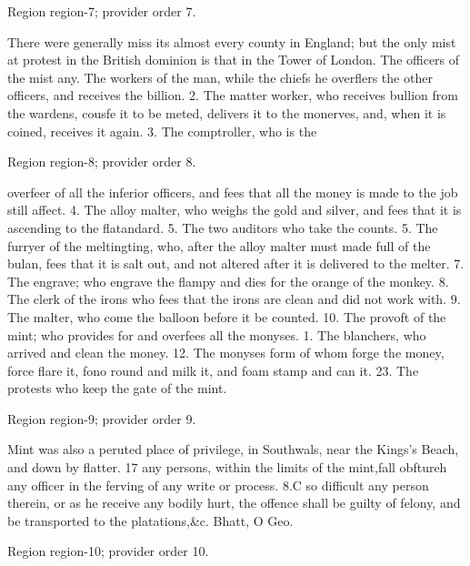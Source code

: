 \documentclass[11pt]{article}
\begin{document}
{\scriptsize\color{gray} Region region-7; provider order 7.\par}
\medskip

There were generally miss its almost every county in England; but the only mist at protest in the British dominion is that in the Tower of London. The officers of the mist any. The workers of the man, while the chiefs he overflers the other officers, and receives the billion. 2. The matter worker, who receives bullion from the wardens, cousfe it to be meted, delivers it to the monerves, and, when it is coined, receives it again. 3. The comptroller, who is the
\par

{\scriptsize\color{gray} Region region-8; provider order 8.\par}
\medskip

overfeer of all the inferior officers, and fees that all the money is made to the job still affect. 4. The alloy malter, who weighs the gold and silver, and fees that it is ascending to the flatandard. 5. The two auditors who take the counts. 5. The furryer of the meltingting, who, after the alloy malter must made full of the bulan, fees that it is salt out, and not altered after it is delivered to the melter. 7. The engrave; who engrave the flampy and dies for the orange of the monkey. 8. The clerk of the irons who fees that the irons are clean and did not work with. 9. The malter, who come the balloon before it be counted. 10. The provoft of the mint; who provides for and overfees all the monyses. 1. The blanchers, who arrived and clean the money. 12. The monyses form of whom forge the money, force flare it, fono round and milk it, and foam stamp and can it. 23. The protests who keep the gate of the mint.
\par

{\scriptsize\color{gray} Region region-9; provider order 9.\par}
\medskip

Mint was also a peruted place of privilege, in Southwals, near the Kings’s Beach, and down by flatter. 17 any persons, within the limits of the mint,fall obftureh any officer in the ferving of any write or process. 8.C so difficult any person therein, or as he receive any bodily hurt, the offence shall be guilty of felony, and be transported to the platations,\&c. Bhatt, O Geo.
\par

{\scriptsize\color{gray} Region region-10; provider order 10.\par}
\medskip
\end{document}
